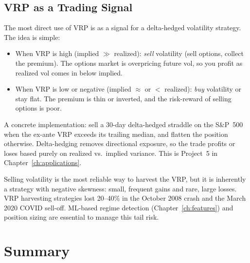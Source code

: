 \subsection{VRP as a Trading Signal}

The most direct use of VRP is as a signal for a delta-hedged volatility strategy.
The idea is simple:

\begin{itemize}[nosep]
  \item When VRP is high (implied $\gg$ realized): \emph{sell} volatility (sell options, collect the premium). The options market is overpricing future vol, so you profit as realized vol comes in below implied.
  \item When VRP is low or negative (implied $\approx$ or $<$ realized): \emph{buy} volatility or stay flat. The premium is thin or inverted, and the risk-reward of selling options is poor.
\end{itemize}

A concrete implementation: sell a 30-day delta-hedged straddle on the S\&P~500 when the ex-ante VRP exceeds its trailing median, and flatten the position otherwise.
Delta-hedging removes directional exposure, so the trade profits or loses based purely on realized vs.\ implied variance.
This is Project~5 in Chapter~\ref{ch:applications}.

\begin{warning}
Selling volatility is the most reliable way to harvest the VRP, but it is inherently a strategy with negative skewness: small, frequent gains and rare, large losses.
VRP harvesting strategies lost 20--40\% in the October 2008 crash and the March 2020 COVID sell-off.
ML-based regime detection (Chapter~\ref{ch:features}) and position sizing are essential to manage this tail risk.
\end{warning}



\section*{Summary}

